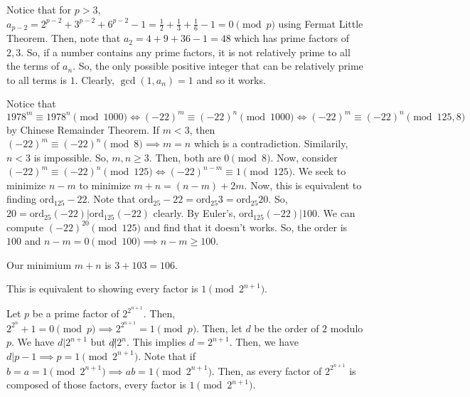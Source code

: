 \documentclass[11pt]{article}
\begin{document}
\begin{sol}
Notice that for $p>3$, $a_{p-2}=2^{p-2}+3^{p-2}+6^{p-2}-1=\frac{1}{2}+\frac{1}{3}+\frac{1}{6}-1=0\pmod{p}$ using Fermat Little Theorem. Then, note that $a_{2}=4+9+36-1=48$ which has prime factors of $2,3$. So, if a number contains any prime factors, it is not relatively prime to all the terms of $a_{n}$. So, the only possible positive integer that can be relatively prime to all terms is $\boxed{1}$. Clearly, $\gcd(1,a_{n})=1$ and so it works.
\end{sol}


\begin{sol}
Notice that $1978^{m}\equiv 1978^{n}\pmod{1000}\iff (-22)^m \equiv (-22)^n \pmod{1000} \iff (-22)^m \equiv (-22)^n \pmod{125,8}$ by Chinese Remainder Theorem.
If $m<3$, then $(-22)^m\equiv (-22)^n\pmod{8}\implies m=n$ which is a contradiction. Similarily, $n<3$ is impossible. So, $m,n\ge3$. Then, both are $0\pmod{8}$.
Now, consider $(-22)^{m}\equiv (-22)^{n}\pmod{125}\iff (-22)^{n-m}\equiv 1\pmod{125}$. We seek to minimize $n-m$ to minimize $m+n=(n-m)+2m$. Now, this is equivalent to finding $\text{ord}_{125} -22$. Note that $\text{ord}_{25} -22 = \text{ord}_{25} 3 = \text{ord}_{25} 20$. So, $20=\text{ord}_{25}(-22) |\text{ord}_{125} (-22)$ clearly. By Euler's, $\text{ord}_{125} (-22)|100$. We can compute $(-22)^{20} \pmod{125}$ and find that it doesn't works. So, the order is $100$ and $n-m=0\pmod{100}\implies n-m\ge 100$.

Our minimium $m+n$ is $3+103=\boxed{106}$.
\end{sol}


\begin{sol}
This is equivalent to showing every factor is $1\pmod{2^{n+1}}$.

Let $p$ be a prime factor of $2^{2^{n+1}}$. Then, $2^{2^{n}}+1=0\pmod{p}\implies 2^{2^{n+1}}=1\pmod{p}$. Then, let $d$ be the order of $2$ modulo $p$. We have $d|2^{n+1}$ but $d\not | 2^{n}$. This implies $d=2^{n+1}$. Then, we have $d|p-1\implies p=1\pmod{2^{n+1}}$. Note that if $b=a=1\pmod{2^{n+1}}\implies ab = 1\pmod{2^{n+1}}$. Then, as every factor of $2^{2^{n+1}}$ is composed of those factors, every factor is $1\pmod{2^{n+1}}$.
\end{sol}
\end{document}

